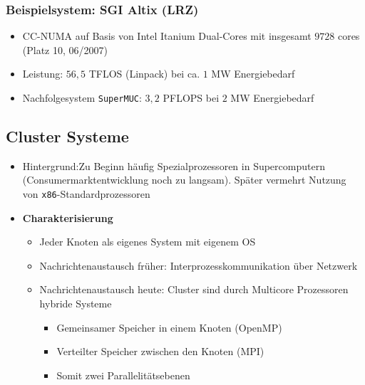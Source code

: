 \subsubsection{Beispielsystem: SGI Altix (LRZ)}
\begin{itemize}
	\item CC-NUMA auf Basis von Intel Itanium Dual-Cores mit insgesamt \(9728\) cores (Platz 10, 06/2007)
	\item Leistung: \(56,5\) TFLOS (Linpack) bei ca. \(1\) MW Energiebedarf
	\item Nachfolgesystem \texttt{SuperMUC}: \(3,2\) PFLOPS bei \(2\) MW Energiebedarf
\end{itemize}


\subsection{Cluster Systeme}
\begin{itemize}
	\item Hintergrund:Zu Beginn häufig Spezialprozessoren in Supercomputern (Consumermarktentwicklung noch zu langsam). Später vermehrt Nutzung von \texttt{x86}-Standardprozessoren
	\item \textbf{Charakterisierung}
	\begin{itemize}
		\item Jeder Knoten als eigenes System mit eigenem OS
		\item Nachrichtenaustausch früher: Interprozesskommunikation über Netzwerk
		\item Nachrichtenaustausch heute: Cluster sind durch Multicore Prozessoren hybride Systeme
		\begin{itemize}
			\item Gemeinsamer Speicher in einem Knoten (OpenMP)
			\item Verteilter Speicher zwischen den Knoten (MPI)
			\item Somit zwei Parallelitätsebenen
		\end{itemize}
	\end{itemize}
\end{itemize}

